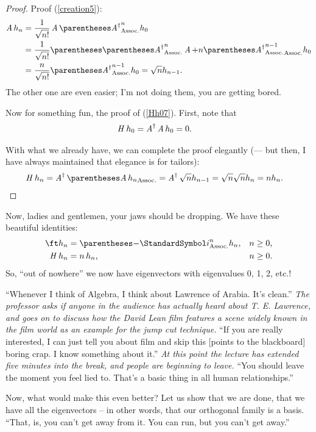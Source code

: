 \documentclass[10pt, a4paper, twoside]{lecturenotes}
\newcommand{\opAdag}{\adj{\opA}}
\begin{document}
\begin{lecture}[date=2013-03-28]
\begin{proposition}
\begin{proof}
  Proof (\ref{creation5}):
  \begin{align*}
  \opA h_n &= \frac{1}{\sqrt{\Factorial n}} \opA\pa{\opAdag}^n h_0 \\
  &= \frac{1}{\sqrt{\Factorial n}}\pa{\pa{\opAdag}^n\opA + n \pa{\opAdag}^{n-1}}h_0\\
  &= \frac{n}{\sqrt{\Factorial n}} \pa{\opAdag}^{n-1} h_0 = \sqrt{n} h_{n-1}\text.
  \end{align*}
  The other one are even easier; I'm not doing them, you are getting bored.

  Now for something fun, the proof of (\ref{Hh07}). First, note that
  \begin{align*}
    \opH h_0 &= \opAdag \opA h_0 = 0\text.
  \end{align*}

  With what we already have, we can complete the proof elegantly (— but then, I have always maintained that elegance is for tailors):
 \begin{align*}
   \opH h_n &= \opAdag \pa{\opA h_n} = \opAdag \sqrt{n} h_{n-1} = \sqrt{n} \sqrt{n} h_n = n h_n\text.
 \end{align*}
\end{proof}
\end{proposition}
Now, ladies and gentlemen, your jaws should be dropping. We have these beautiful identities:
\begin{align*}
  \ft h_n &= \pa{-\I}^n h_n \text, && n \geq 0 \text,\\
  \opH h_n &= n\, h_n\text, && n \geq 0 \text.
\end{align*}
So, ``out of nowhere'' we now have eigenvectors with eigenvalues 0, 1, 2, etc.!

``Whenever I think of Algebra, I think about Lawrence of Arabia. It's clean.'' \emph{The professor asks if anyone in the audience has actually heard about T. E. Lawrence, and goes on to discuss how the David Lean film features a scene widely known in the film world as an example for the jump cut technique.} ``If you are really interested, I can just tell you about film and skip this [points to the blackboard] boring crap. I know something about it.'' \emph{At this point the lecture has extended five minutes into the break, and people are beginning to leave.}
``You should leave the moment you feel lied to. That's a basic thing in all human relationships.''

Now, what would make this even better? Let us show that we are done, that we have all the eigenvectors – in other words, that our orthogonal family is a basis. ``That, is, you can't get away from it. You can run, but you can't get away.''


\end{lecture}
\end{document}
